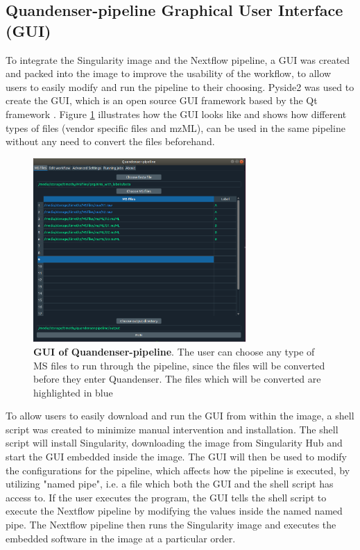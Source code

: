 \subsection{Quandenser-pipeline Graphical User Interface (GUI)}
To integrate the Singularity image and the Nextflow pipeline, a GUI was created and packed into the image to improve the usability of the workflow, to allow users to easily modify and run the pipeline to their choosing. Pyside2 was used to create the GUI, which is an open source GUI framework based by the Qt framework \cite{pyside2}. Figure \ref{fig:GUI} illustrates how the GUI looks like and shows how different types of files (vendor specific files and mzML), can be used in the same pipeline without any need to convert the files beforehand.

\begin{figure}[H]
  \begin{center}
  \includegraphics[height=7cm]{pictures/gui.png}
  \caption{\textbf{GUI of Quandenser-pipeline}. The user can choose any type of MS files to run through the pipeline, since the files will be converted before they enter Quandenser. The files which will be converted are highlighted in blue}
  \label{fig:GUI}
  \end{center}
\end{figure}

To allow users to easily download and run the GUI from within the image, a shell script was created to minimize manual intervention and installation. The shell script will install Singularity, downloading the image from Singularity Hub and start the GUI embedded inside the image. The GUI will then be used to modify the configurations for the pipeline, which affects how the pipeline is executed, by utilizing "named pipe", i.e. a file which both the GUI and the shell script has access to. If the user executes the program, the GUI tells the shell script to execute the Nextflow pipeline by modifying the values inside the named named pipe. The Nextflow pipeline then runs the Singularity image and executes the embedded software in the image at a particular order.

